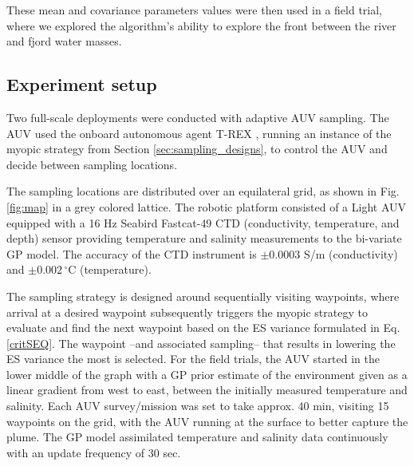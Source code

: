 \documentclass[aoas]{imsart}
\begin{document}
These mean and covariance parameters values were then used in a field trial, where we explored the algorithm's ability to explore the front between the river and fjord water masses. 

\subsection{Experiment setup}

Two full-scale deployments were conducted with adaptive AUV sampling.
The AUV used the onboard autonomous agent T-REX \citep{Mcgann}, running an instance of the myopic strategy from Section \ref{sec:sampling_designs}, to control the AUV and decide between sampling locations. 

The sampling locations are distributed over an equilateral grid, as shown in Fig. \ref{fig:map} in a grey colored lattice. The robotic platform consisted of a Light AUV \citep{sousa2012lauv} equipped with a 16 Hz Seabird Fastcat-49 CTD (conductivity, temperature, and depth) sensor providing temperature and salinity measurements to the bi-variate GP model. The accuracy of the CTD instrument is $\pm 0.0003$ S/m (conductivity) and $\pm0.002\,^{\circ}\mathrm{C}$ (temperature).



The sampling strategy is designed around sequentially visiting waypoints, where arrival at a desired waypoint subsequently triggers the myopic strategy to evaluate and find the next waypoint based on the ES variance formulated in Eq. \eqref{critSEQ}. The waypoint --and associated sampling-- that results in lowering the ES variance the most is selected. For the field trials, the AUV started in the lower middle of the graph with a GP prior estimate of the environment given as a linear gradient from west to east, between the initially measured temperature and salinity. Each AUV survey/mission was set to take approx. 40 min, visiting 15 waypoints on the grid, with the AUV running at the surface to better capture the plume. The GP model assimilated temperature and salinity data continuously with an update frequency of 30 sec.
\end{document}
